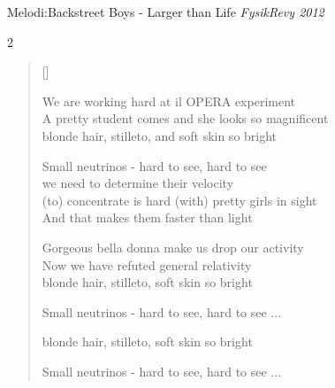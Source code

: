 \newpage
{}
{Melodi:Backstreet Boys - Larger than Life}
{\small\itshape FysikRevy  2012}
\settowidth{\versewidth}{A pretty student comes and she looks so magnificent}
\begin{multicols}2
\begin{verse}[\versewidth]

We are working hard at il OPERA experiment\\
A pretty student comes and she looks so magnificent\\
blonde hair, stilleto, and soft skin so bright

Small neutrinos - hard to see, hard to see\\
we need to determine their velocity\\
(to) concentrate is hard (with) pretty girls in sight\\
And that makes them faster than light

Gorgeous bella donna make us drop our activity\\
Now we have refuted general relativity\\
blonde hair, stilleto, soft skin so bright

Small neutrinos - hard to see, hard to see ...

blonde hair, stilleto, soft skin so bright

Small neutrinos - hard to see, hard to see ...
\end{verse}
\end{multicols}

